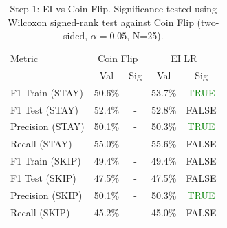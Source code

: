 \begin{table}[ht]
\centering
\begin{tabular}{lcccc}
\hline
Metric & \multicolumn{2}{c}{Coin Flip} & \multicolumn{2}{c}{EI LR} \\
 & Val & Sig & Val & Sig \\
\hline
F1 Train (STAY) & 50.6\% & - & 53.7\% & \textcolor{green}{TRUE} \\
F1 Test (STAY) & 52.4\% & - & 52.8\% & FALSE \\
Precision (STAY) & 50.1\% & - & 50.3\% & \textcolor{green}{TRUE} \\
Recall (STAY) & 55.0\% & - & 55.6\% & FALSE \\
F1 Train (SKIP) & 49.4\% & - & 49.4\% & FALSE \\
F1 Test (SKIP) & 47.5\% & - & 47.5\% & FALSE \\
Precision (SKIP) & 50.1\% & - & 50.3\% & \textcolor{green}{TRUE} \\
Recall (SKIP) & 45.2\% & - & 45.0\% & FALSE \\
\hline
\end{tabular}
\caption{Step 1: EI vs Coin Flip. Significance tested using Wilcoxon signed-rank test against Coin Flip (two-sided, $\alpha=0.05$, N=25).}
\label{tab:metrics_intra_1}
\end{table}
